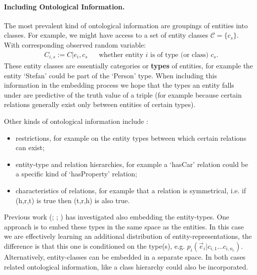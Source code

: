 \paragraph{Including Ontological Information.} 
The most prevalent kind of ontological information are groupings of entities into classes.
For example, we might have access to a set of entity classes $\mathcal{C} = \{ c_s \}$. With corresponding observed random variable:
\begin{align}
&    C_{i,s} := C|e_i, c_s    &  &\text{whether entity $i$ is of type (or class) $c_s$.}
\end{align}
These entity classes are essentially categories or \textbf{types} of entities, for example the entity `Stefan' could be part of the `Person' type. When including this information in the embedding process we hope that the types an entity falls under are predictive of the truth value of a triple (for example because certain relations generally exist only between entities of certain types).


Other kinds of ontological information include : %
\begin{itemize} \setlength\itemsep{0em}
    \item restrictions, for example on the entity types between which certain relations can exist;
    \item entity-type and relation hierarchies, for example a `hasCar' relation could be a specific kind of `hasProperty' relation;
    \item characteristics of relations, for example that a relation is symmetrical, i.e. if (h,r,t) is true then (t,r,h) is also true.
\end{itemize}

Previous work (; ; )
has investigated also embedding the entity-types. 
One approach is to embed these types in the same space as the entities. 
In this case we are effectively learning an additional distribution of entity-representations, the difference is that this one is conditioned on the type(s), e.g. $p_i(\vec{e}_i|c_{i,1} \dots c_{i,n_c})$. 
Alternatively, entity-classes can be embedded in a separate space.
In both cases related ontological information, like a class hierarchy could also be incorporated.



